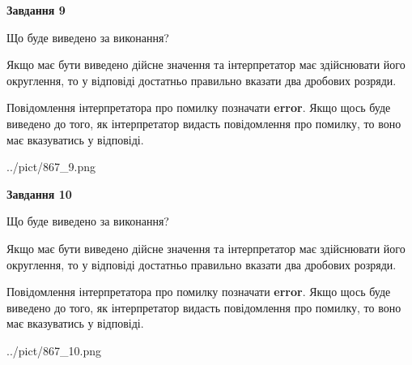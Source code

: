 \documentclass[12pt, ukrainian]{article}
\begin{document}
{\begin {Large}
{\begin {center}\textbf{Завдання 9}\end {center}}\par
Що буде виведено за виконання? \par

Якщо має бути виведено дійсне значення та інтерпретатор має здійснювати його округлення, 
то у відповіді достатньо правильно вказати два дробових розряди.

Повідомлення інтерпретатора про помилку позначати \textbf{error}.
Якщо щось буде виведено до того, як інтерпретатор видасть повідомлення про помилку, 
то воно має вказуватись у відповіді. \par

\begin{center}
	{../pict/867_9.png}
\end{center}
\newpage

{\begin {center}\textbf{Завдання 10}\end {center}}\par
Що буде виведено за виконання? \par

Якщо має бути виведено дійсне значення та інтерпретатор має здійснювати його округлення, 
то у відповіді достатньо правильно вказати два дробових розряди.

Повідомлення інтерпретатора про помилку позначати \textbf{error}.
Якщо щось буде виведено до того, як інтерпретатор видасть повідомлення про помилку, 
то воно має вказуватись у відповіді. \par

\begin{center}
	{../pict/867_10.png}
\end{center}
\newpage

\end {Large}}
\end{document}
